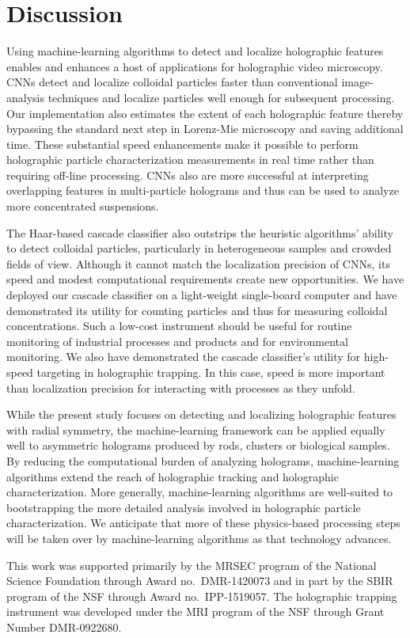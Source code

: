 \section{Discussion}

Using machine-learning algorithms to detect and
localize holographic features enables and enhances a host of 
applications for holographic video microscopy.
CNNs detect and localize colloidal
particles faster than conventional image-analysis techniques
and localize particles well enough for subsequent processing.
Our implementation also estimates the extent of each holographic feature 
thereby bypassing the standard next step in Lorenz-Mie microscopy
\cite{cheong09} and saving additional time.
These substantial speed enhancements make it possible to
perform holographic particle characterization measurements in real
time rather than requiring off-line processing.
CNNs also are more successful at
interpreting overlapping features in multi-particle
holograms and thus can be used to analyze more concentrated
suspensions.

The Haar-based cascade classifier also outstrips the heuristic algorithms'
ability to detect colloidal particles, particularly in heterogeneous
samples and crowded fields of view.
Although it cannot match the localization precision of CNNs,
its speed and modest computational requirements
create new opportunities.
We have deployed our cascade classifier on a light-weight
single-board computer and have demonstrated its utility for counting particles
and thus for measuring colloidal concentrations.
Such a low-cost instrument should be useful for routine monitoring of
industrial processes and products and for environmental monitoring.
We also have demonstrated the cascade classifier's utility for
high-speed targeting in holographic trapping.  In this case, speed
is more important than localization precision for interacting with
processes as they unfold.

While the present study focuses on detecting and localizing
holographic features with radial symmetry,
the machine-learning framework can be applied equally well to
asymmetric holograms produced by rods, clusters
or biological samples.
By reducing the computational burden of analyzing holograms,
machine-learning algorithms extend the reach of holographic
tracking and holographic characterization.
More generally, machine-learning algorithms are well-suited to bootstrapping
the more detailed analysis involved in holographic particle
characterization.
We anticipate that more of these physics-based
processing steps will be taken over by machine-learning algorithms
as that technology advances.

This work was supported primarily by the MRSEC program of the
National Science Foundation through Award no.\ DMR-1420073
and in part by the SBIR program of the NSF through Award no.\
IPP-1519057.
The holographic trapping instrument was developed under the
MRI program of the NSF through Grant Number DMR-0922680.

